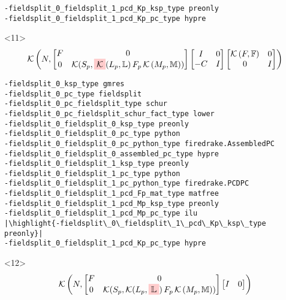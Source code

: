 \documentclass[presentation]{beamer}
\newcommand{\KSP}[2]{\ensuremath{\mathcal{K}\left(#1, \mathbb{#2}\right)}}
\newcommand{\ksp}[1]{\KSP{#1}{#1}}
\newcommand{\highlight}[1]{\colorbox{red!20}{\color{black} #1}}
\begin{document}
\begin{frame}[fragile]
\begin{onlyenv}
\begin{verbatim}
-fieldsplit_0_fieldsplit_1_pcd_Kp_ksp_type preonly
-fieldsplit_0_fieldsplit_1_pcd_Kp_pc_type hypre
\end{verbatim}
  \end{onlyenv}
  \begin{onlyenv}<11>
    \color{gray}
    \begin{equation*}
      \KSP{N}{%
        \begin{bmatrix}
        F & 0 \\
        0 & \mathcal{K}(S_p, \highlight{$\mathcal{K}$}(L_p, \mathbb{L})\,F_p \, \KSP{M_p}{M})
      \end{bmatrix}
      \begin{bmatrix}
        I & 0\\
        -C & I
      \end{bmatrix}
      \begin{bmatrix}
        \ksp{F} & 0 \\
        0 & I
      \end{bmatrix}}
    \end{equation*}
\begin{verbatim}
-fieldsplit_0_ksp_type gmres
-fieldsplit_0_pc_type fieldsplit
-fieldsplit_0_pc_fieldsplit_type schur
-fieldsplit_0_pc_fieldsplit_schur_fact_type lower
-fieldsplit_0_fieldsplit_0_ksp_type preonly
-fieldsplit_0_fieldsplit_0_pc_type python
-fieldsplit_0_fieldsplit_0_pc_python_type firedrake.AssembledPC
-fieldsplit_0_fieldsplit_0_assembled_pc_type hypre
-fieldsplit_0_fieldsplit_1_ksp_type preonly
-fieldsplit_0_fieldsplit_1_pc_type python
-fieldsplit_0_fieldsplit_1_pc_python_type firedrake.PCDPC
-fieldsplit_0_fieldsplit_1_pcd_Fp_mat_type matfree
-fieldsplit_0_fieldsplit_1_pcd_Mp_ksp_type preonly
-fieldsplit_0_fieldsplit_1_pcd_Mp_pc_type ilu
|\highlight{-fieldsplit\_0\_fieldsplit\_1\_pcd\_Kp\_ksp\_type preonly}|
-fieldsplit_0_fieldsplit_1_pcd_Kp_pc_type hypre
\end{verbatim}
  \end{onlyenv}
  \begin{onlyenv}<12>
    \color{gray}
    \begin{equation*}
      \KSP{N}{%
        \begin{bmatrix}
        F & 0 \\
        0 & \mathcal{K}(S_p, \mathcal{K}(L_p, \highlight{$\mathbb{L}$})\,F_p \, \KSP{M_p}{M})
      \end{bmatrix}
      \begin{bmatrix}
        I & 0\\

\end{bmatrix}}
\end{equation*}
\end{onlyenv}
\end{frame}
\end{document}
